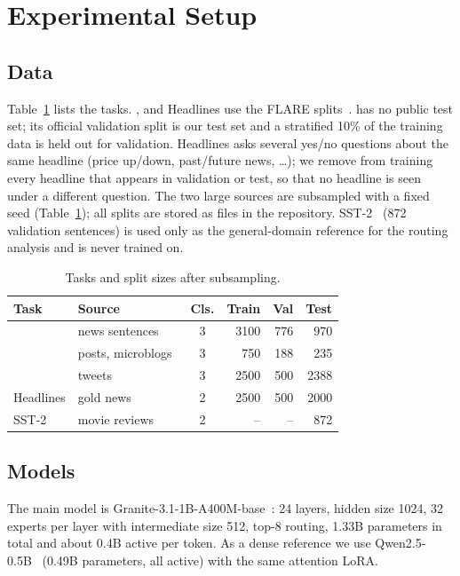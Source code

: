\section{Experimental Setup}

\subsection{Data}
Table~\ref{tab:data} lists the tasks. \fpb{}, \fiqa{} and Headlines use the FLARE
splits~\cite{xie2023pixiu}. \tfns{} has no public test set; its official validation split is
our test set and a stratified 10\% of the training data is held out for validation. Headlines
asks several yes/no questions about the same headline (price up/down, past/future news, \ldots);
we remove from training every headline that appears in validation or test, so that no headline
is seen under a different question. The two large sources are subsampled with a fixed seed
(Table~\ref{tab:data}); all splits are stored as files in the repository.
SST-2~\cite{socher2013sst} (872 validation sentences) is used only as the general-domain
reference for the routing analysis and is never trained on.

\begin{table}[t]
\centering
\caption{Tasks and split sizes after subsampling.}
\label{tab:data}
\begin{tabular}{l l c r r r}
\toprule
Task & Source & Cls. & Train & Val & Test \\
\midrule
\fpb{} & news sentences~\cite{malo2014fpb} & 3 & 3100 & 776 & 970 \\
\fiqa{} & posts, microblogs~\cite{maia2018fiqa} & 3 & 750 & 188 & 235 \\
\tfns{} & tweets~\cite{tfns2022} & 3 & 2500 & 500 & 2388 \\
Headlines & gold news~\cite{sinha2021headlines} & 2 & 2500 & 500 & 2000 \\
SST-2 & movie reviews~\cite{socher2013sst} & 2 & -- & -- & 872 \\
\bottomrule
\end{tabular}
\end{table}

\subsection{Models}
The main model is Granite-3.1-1B-A400M-base~\cite{granite2024}: 24 layers, hidden size 1024,
32 experts per layer with intermediate size 512, top-8 routing, 1.33B parameters in total and
about 0.4B active per token. As a dense reference we use Qwen2.5-0.5B~\cite{qwen2025qwen25}
(0.49B parameters, all active) with the same attention LoRA.

